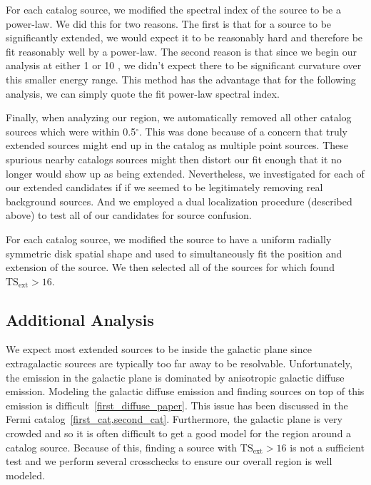\documentclass[12pt,preprint]{aastex}
\newcommand{\gev}{\text{GeV}\xspace}
\newcommand{\tsext}{{\ensuremath{\text{TS}_\text{ext}}}\xspace}
\renewcommand{\deg}{\ensuremath{^\circ}\xspace}
\newcommand{\pointlike}{\text{\em pointlike}\xspace}
\begin{document}
For each catalog source, we modified the spectral index of the source
to be a power-law. We did this for two reasons. The first is that for a
source to be significantly extended, we would expect it to be reasonably
hard and therefore be fit reasonably well by a power-law.  The second reason
is that since we begin our analysis at either 1 \gev or 10 \gev, we didn't
expect there to be significant curvature over this smaller energy range.
This method has the advantage that for the following analysis, we can
simply quote the fit power-law spectral index.

Finally, when analyzing our region, we automatically removed all other
catalog sources which were within 0.5\deg. This was done because of
a concern that truly extended sources might end up in the catalog as
multiple point sources. These spurious nearby catalogs sources might then
distort our fit enough that it no longer would show up as being extended.
Nevertheless, we investigated for each of our extended candidates if
if we seemed to be legitimately removing real background sources. And
we employed a dual localization procedure (described above) to test
all of our candidates for source confusion.

For each catalog source, we modified the source to have a uniform radially
symmetric disk spatial shape and used \pointlike to simultaneously fit
the position and extension of the source.  We then selected all of the
sources for which \pointlike found $\tsext>16$.

\subsection{Additional Analysis}

We expect most extended sources to be inside the galactic plane
since extragalactic sources are typically too far away to be
resolvable. Unfortunately, the \gev emission in the galactic plane
is dominated by anisotropic galactic diffuse emission.  Modeling the
galactic diffuse emission and finding sources on top of this emission is
difficult~\ref{first_diffuse_paper}. This issue has been discussed in the
Fermi catalog~\ref{first_cat,second_cat}. Furthermore, the galactic plane is
very crowded and so it is often difficult to get a good model for the
region around a catalog source.  Because of this, finding a source with
$\tsext>16$ is not a sufficient test and we perform several crosschecks
to ensure our overall region is well modeled.
\end{document}
